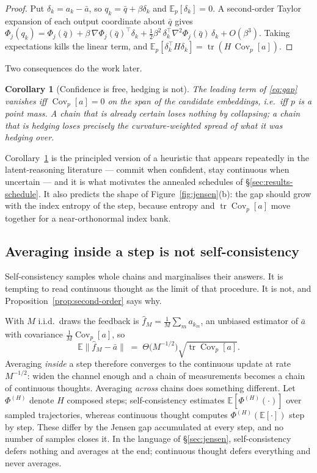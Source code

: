 \documentclass[11pt]{article}
\newtheorem{corollary}{Corollary}
\theoremstyle{definition}
\newcommand{\Ev}{\Phi}
\newcommand{\Exp}{\mathbb{E}}
\newcommand{\Cov}{\operatorname{Cov}}
\newcommand{\tr}{\operatorname{tr}}
\begin{document}
\begin{proof}
Put $\delta_k = a_k - \bar a$, so $q_k = \bar q + \beta \delta_k$ and
$\Exp_p[\delta_k] = 0$. A second-order Taylor expansion of each output coordinate
about $\bar q$ gives
$\Ev_j(q_k) = \Ev_j(\bar q) + \beta\,\nabla \Ev_j(\bar q)^{\top}\delta_k
+ \tfrac{1}{2}\beta^{2}\,\delta_k^{\top}\nabla^{2}\Ev_j(\bar q)\,\delta_k + O(\beta^3)$.
Taking expectations kills the linear term, and
$\Exp_p[\delta_k^{\top} H \delta_k] = \tr(H\,\Cov_p[a])$.
\end{proof}

Two consequences do the work later.

\begin{corollary}[Confidence is free, hedging is not]
\label{cor:confidence}
The leading term of \eqref{eq:gap} vanishes iff $\Cov_p[a] = 0$ on the span of the
candidate embeddings, i.e.\ iff $p$ is a point mass. A chain that is already certain
loses nothing by collapsing; a chain that is hedging loses precisely the
curvature-weighted spread of what it was hedging over.
\end{corollary}

Corollary~\ref{cor:confidence} is the principled version of a heuristic that appears
repeatedly in the latent-reasoning literature --- commit when confident, stay
continuous when uncertain --- and it is what motivates the annealed schedules of
\S\ref{sec:results-schedule}. It also predicts the shape of
Figure~\ref{fig:jensen}(b): the gap should grow with the index entropy of the step,
because entropy and $\tr\Cov_p[a]$ move together for a near-orthonormal index bank.

\subsection{Averaging inside a step is not self-consistency}
\label{sec:mc}

Self-consistency \citep{wang2022selfconsistency} samples whole chains and
marginalises their answers. It is tempting to read continuous thought as the limit of
that procedure. It is not, and Proposition~\ref{prop:second-order} says why.

With $M$ i.i.d.\ draws the feedback is
$\hat f_M = \frac{1}{M}\sum_m a_{k_m}$, an unbiased estimator of $\bar a$ with
covariance $\tfrac1M \Cov_p[a]$, so
\begin{equation}
\Exp\big\|\hat f_M - \bar a\big\| \;=\; \Theta\!\big(M^{-1/2}\big)\sqrt{\tr \Cov_p[a]} .
\label{eq:mc}
\end{equation}
Averaging \emph{inside} a step therefore converges to the continuous update at rate
$M^{-1/2}$: widen the channel enough and a chain of measurements becomes a chain of
continuous thoughts. Averaging \emph{across} chains does something different. Let
$\Ev^{(H)}$ denote $H$ composed steps; self-consistency estimates
$\Exp[\Ev^{(H)}(\cdot)]$ over sampled trajectories, whereas continuous thought
computes $\Ev^{(H)}(\Exp[\cdot])$ step by step. These differ by the Jensen gap
accumulated at every step, and no number of samples closes it. In the language of
\S\ref{sec:jensen}, self-consistency defers nothing and averages at the end;
continuous thought defers everything and never averages.
\end{document}
